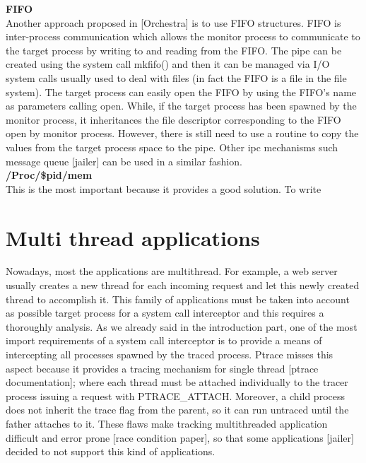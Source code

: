 \textbf{FIFO}\\
Another approach proposed in [Orchestra] is to use FIFO structures.  FIFO is inter-process communication which allows the monitor process to communicate to the target process by writing to and reading from the FIFO.  The pipe can be created using the system call mkfifo()\cite{Garfinkel03ostia:a} and then it can be managed via I/O system calls usually used to deal with files (in fact the FIFO is a file in the file system). 
The target process can easily open the FIFO by using the FIFO’s name as parameters calling open.  While, if the target process has been spawned by the monitor process, it inheritances the file descriptor corresponding to the FIFO open by monitor process. However, there is still need to use a routine to copy the values from the target process space to the pipe.  Other ipc mechanisms such message queue [jailer] can be used in a similar fashion. \\
\textbf{ /Proc/\$pid/mem  }\\
 
This is the most important because it provides a good solution. 
To write 

\section{Multi thread applications}
\label{multi_thread_application}

Nowadays, most the applications are multithread. For example, a web server usually creates a new thread for each incoming request and let this newly created thread to accomplish it. This family of applications must be taken into account as possible target process for a system call interceptor and this requires a thoroughly analysis. As we already said in the introduction part, one of the most import requirements of a system call interceptor is to provide a means of intercepting all processes spawned by the traced process. Ptrace misses this aspect because it provides a tracing mechanism for single thread [ptrace documentation]; where each thread must be attached individually to the tracer process issuing a request with PTRACE\_ATTACH. Moreover, a child process does not inherit the trace flag from the parent, so it can run untraced until the father attaches to it. These flaws make tracking multithreaded application difficult and error prone [race condition paper], so that some applications [jailer] decided to not support this kind of applications.

